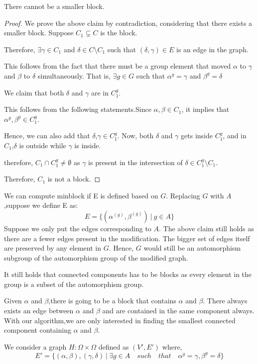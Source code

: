 \begin{claim}
There cannot be a smaller block.
\end{claim}
\begin{proof}
We prove the above claim by contradiction, considering that there exists a smaller block.
Suppose $C_1 \subsetneq C$ is the block.

Therefore, $\exists \gamma \in C_1$ and $\delta \in C \setminus C_1$ such that $(\delta , \gamma) \in E$ is an edge in the graph.

This follows from the fact that there must be a group element that moved $\alpha$ to $\gamma$ and $\beta$ to $\delta$ simultaneously. That is,  $\exists g \in G$ such that $\alpha^g = \gamma$ and $\beta^g = \delta$

We claim that both $\delta$ and $\gamma$ are in $C_1^g$.


This follows from the following statements.Since $\alpha,\beta \in C_1$, it implies that $\alpha^g,\beta^g \in C_1^g$.

Hence, we can also add that $\delta$,$\gamma \in C_1^g$.
Now, both $\delta$ and $\gamma$ gets inside $C_1^g$, and in $ C_1$,$\delta$ is outside while $\gamma$ is inside.

therefore, $C_1 \cap C_1^g \neq \emptyset$ as $\gamma$ is present in the intersection of $\delta \in C_1^g \setminus C_1$.

Therefore, $C_1$ is not a block. 

\end{proof}
We can compute minblock if E is defined based on $G$. 
Replacing $G$ with $A$,suppose we define E as:
\[ E = \{(\alpha^{(g)},\beta^{(g)}) ~|~ g \in A\} \]
Suppose we only put the edges corresponding to $A$. The above claim still holds as there are a fewer edges present in the modification. The bigger set of edges itself are preserved by any element in $G$. Hence, $G$ would still be an automorphism subgroup of the automorphism group of the modified graph. 

It still holds that connected components has to be blocks as every element in the group is a subset of the automorphism group.

Given $\alpha$ and $\beta$,there is going to be a block that contains $\alpha$ and $\beta$. There always exists an edge between $\alpha$ and $\beta$ and are contained in the same component always. With our algorithm,we are only interested in finding the smallest connected component containing $\alpha$ and $\beta$.


We consider a graph $H : \Omega \times \Omega$ defined as $(V',E')$ where,
\[ E' = \{(\alpha,\beta),(\gamma,\delta) ~|~ \exists g \in A \quad such \quad that  \quad \alpha^g = \gamma , \beta^g = \delta\} \]

